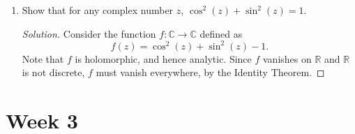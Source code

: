 \documentclass[11pt]{article}
\theoremstyle{definition}
\newenvironment{soln}{\begin{proof}[Solution]}{\end{proof}}
\begin{document}
\begin{enumerate}[leftmargin=*]
    \begin{soln}
    We prove that $\cos$ is surjective. A similar method works for $\sin$. Recall that
    \[
        \cos(z) = \frac{1}{2} \left( e^{\iota z} + e^{-\iota z} \right).
    \]  
    Let $z_0 \in \mathbb{C}$. As before, it suffices to show that $\cos(z) = z_0$ for some $z \in \mathbb{C}$. Consider the quadratic equation
    \begin{equation*}
        \frac{1}{2} \left( t + \frac{1}{t} \right) = z_0 \quad \quad (\dag)
    \end{equation*}
    Rearranging this gives us
    \[
        t^2 - 2z_0t + 1 = 0.
    \]
    Since the above is a (non-constant) complex polynomial, it has a complex root $t_0$ (by FTA). Moreover, note that $t_0 \neq 0$. By the previous question, there exists $z^{\prime} \in \mathbb{C}$ satisfying $e^{z^{\prime}} = t_0$. Considering $z = z^{\prime}/\iota$, we see that $e^{\iota z} = t_0$. Plugging $t_0 = e^{\iota z}$ in $(\dag)$ gives us
    \[
        \cos(z) = z_0,
    \]
    as desired.
    \end{soln}
    
    \item Show that for any complex number $z$, $\cos^2(z) + \sin^2(z) = 1$.
    
    \begin{soln}
    Consider the function $f \colon \mathbb{C} \to \mathbb{C}$ defined as
    \[
        f(z) = \cos^2(z) + \sin^2(z) - 1.
    \]
    Note that $f$ is holomorphic, and hence analytic. Since $f$ vanishes on $\mathbb{R}$ and $\mathbb{R}$ is not discrete, $f$ must vanish everywhere, by the Identity Theorem.
    \end{soln}
\end{enumerate}

\newpage

\section{Week 3}
\end{document}
